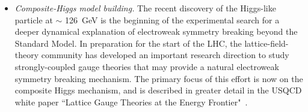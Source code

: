 \begin{itemize}

\item {\it Composite-Higgs model building.}  The recent discovery of the Higgs-like particle at $\sim$ 126~GeV is the beginning of the experimental
search for a deeper dynamical explanation of electroweak symmetry breaking beyond the Standard
Model.  In preparation for the start of the LHC, the lattice-field-theory community has developed an important research direction to study strongly-coupled gauge theories that may provide a natural electroweak symmetry breaking mechanism.  The primary focus of this effort is now on the composite Higgs mechanism, and is described in greater detail in the USQCD white paper ``Lattice Gauge Theories at the Energy Frontier"~\cite{USQCD_EF_whitepaper13}. 


\end{itemize}
